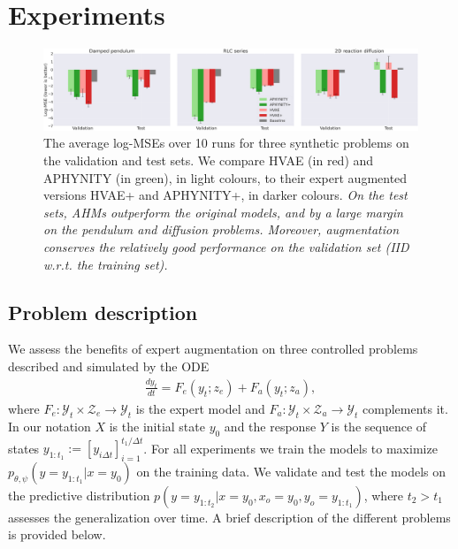 \documentclass{article}
\begin{document}
\section{Experiments}
\begin{figure}
    \centering
    \includegraphics[width=.98\textwidth]{figures/results_log_mse.png}
    \vspace{-1em}
    \caption{The average log-MSEs over 10 runs for three synthetic problems on the validation and test sets. We compare HVAE (in red) and APHYNITY (in green), in light colours, to their expert augmented versions HVAE+ and APHYNITY+, in darker colours. \textit{On the test sets, AHMs outperform the original models, and by a large margin on the pendulum and diffusion problems. Moreover, augmentation conserves the relatively good performance on the validation set (IID w.r.t. the training set).}}
    \label{fig:log_mse}
    \vspace{-1.em}
\end{figure}

\subsection{Problem description} \label{sec:problems_description}
We assess the benefits of expert augmentation on three controlled problems described and simulated by the ODE
\begin{align}
    \frac{dy_t}{dt} = F_e(y_t; z_e) + F_a(y_t; z_a), \label{eq:generic_ode}
\end{align}
where $F_e: \mathcal{Y}_t \times \mathcal{Z}_e \rightarrow \mathcal{Y}_t$ is the expert model and $F_a: \mathcal{Y}_t \times \mathcal{Z}_a \rightarrow \mathcal{Y}_t$ complements it. In our notation $X$ is the initial state $y_0$ and the response $Y$ is the sequence of states $y_{1:t_1}:=[y_{i\Delta t}]_{i=1}^{t_1 \!/\! \Delta t}$. For all experiments we train the models to maximize $p_{\theta, \psi}(y=y_{1:t_1}|x=y_0)$ on the training data. We validate and test the models on the predictive distribution $p(y=y_{1:t_2}|x=y_0, x_o=y_0, y_o=y_{1:t_1})$, where $t_2 > t_1$ assesses the generalization over time. A brief description of the different problems is provided below.
\end{document}
